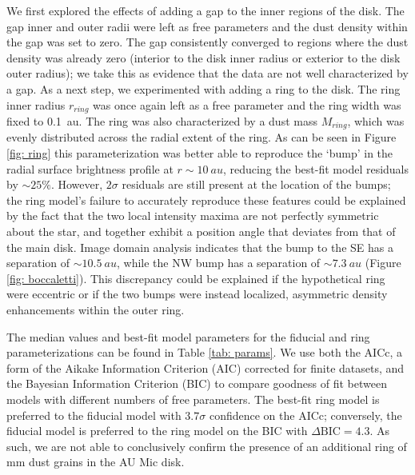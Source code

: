 \documentclass[modern]{aastex62}
\begin{document}
We first explored the effects of adding a gap  to the inner regions of the disk. 
The gap inner and outer radii were left as free parameters and the dust density within the gap was set to zero.
The gap consistently converged to regions where the dust density was already zero (interior to the disk inner radius or exterior to the disk outer radius); we take this as evidence that the data are not well characterized by a gap.
As a next step, we experimented with adding a ring to the disk.
The ring inner radius $r_{ring}$ was once again left as a free parameter and the ring width was fixed to \SI{0.1}{au}.
The ring was also characterized by a dust mass $M_{ring}$, which was evenly distributed across the radial extent of the ring. 
As can be seen in Figure \ref{fig: ring} this parameterization was better able to reproduce the `bump' in the radial surface brightness profile at $r \sim \SI{10}{au}$, reducing the best-fit model residuals by $\sim 25 \%$. 
However, $2 \sigma$ residuals are still present at the location of the bumps; the ring model's failure to accurately reproduce these features could be explained by the fact that the two local intensity maxima are not perfectly symmetric about the star, and together exhibit a position angle that deviates from that of the main disk. 
Image domain analysis indicates that the bump to the SE has a separation of $\sim \SI{10.5}{au}$, while the NW bump has a separation of $\sim \SI{7.3}{au}$ (Figure \ref{fig: boccaletti}). 
This discrepancy could be explained if the hypothetical ring were eccentric or if the two bumps were instead localized, asymmetric density enhancements within the outer ring.

The median values and best-fit model parameters for the fiducial and ring parameterizations can be found in Table \ref{tab: params}. 
We use both the AICc, a form of the Aikake Information Criterion (AIC) corrected for finite datasets, and the Bayesian Information Criterion (BIC) to compare goodness of fit between models with different numbers of free parameters.  
The best-fit ring model is preferred to the fiducial model with $3.7 \sigma$ confidence on the AICc; conversely, the fiducial model is preferred to the ring model on the BIC with $\Delta \text{BIC} = 4.3$.
As such, we are not able to conclusively confirm the presence of an additional ring of mm dust grains in the AU Mic disk.
\end{document}
